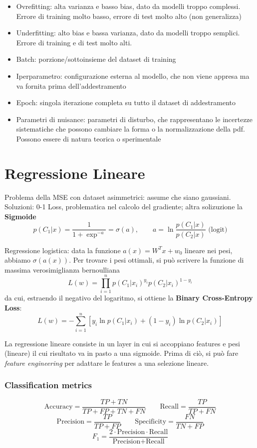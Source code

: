 \documentclass{article}
\begin{document}
\begin{itemize}
    \item Ovrefitting: alta varianza e basso bias, dato da modelli troppo complessi. Errore di training molto basso, errore di test molto alto (non generalizza)
    \item Underfitting: alto bias e bassa varianza, dato da modelli troppo semplici. Errore di training e di test molto alti.
    \item Batch: porzione/sottoinsieme del dataset di training
    \item Iperparametro: configurazione esterna al modello, che non viene appresa ma va fornita prima dell'addestramento
    \item Epoch: singola iterazione completa su tutto il dataset di addestramento
    \item Parametri di nuisance: parametri di disturbo, che rappresentano le incertezze sistematiche che possono cambiare la forma o la normalizzazione della pdf. Possono essere di natura teorica o sperimentale

\end{itemize}

\section{Regressione Lineare}
Problema della MSE con dataset asimmetrici: assume che siano gaussiani. Soluzioni: 0-1 Loss, problematica nel calcolo del gradiente; altra solizuzione
la \textbf{Sigmoide}
\[
p(C_1|x)=\frac{1}{1+\exp^{-a}} = \sigma(a), \qquad a=\ln\frac{p(C_1|x)}{p(C_2|x)}\text{ (logit)}
\]

Regressione logistica: data la funzione $a(x)=W^Tx+w_0$ lineare nei pesi, abbiamo $\sigma(a(x))$.\newline
Per trovare i pesi ottimali, si può scrivere la funzione di massima verosimiglianza bernoulliana
\[
L(w) = \prod_{i=1}^n p(C_1|x_i)^{y_i}p(C_2|x_i)^{1-y_i}
\]
da cui, estraendo il negativo del logaritmo, si ottiene la \textbf{Binary Cross-Entropy Loss}:
\[
L(w) = - \sum_{i=1}^n [y_i\ln p(C_1|x_i) + (1-y_i)\ln p(C_2|x_i)]
\]

La regressione lineare consiste in un layer in cui si accoppiano features e pesi (lineare) il cui risultato va in pasto a una sigmoide. Prima di ciò, si può
fare \textit{feature engineering} per adattare le features a una selezione lineare.

\subsubsection*{Classification metrics}
\[
\text{Accuracy} = \frac{TP + TN}{TP+FP+TN+FN} \qquad \text{Recall}=\frac{TP}{TP + FN}
\]
\[
\text{Precision} = \frac{TP}{TP+FP} \qquad \text{Specificity}=\frac{FN}{TN+FP}
\]
\[
F_1 = \frac{2\cdot\text{Precision}\cdot\text{Recall}}{\text{Precision}+\text{Recall}}
\]
\end{document}
